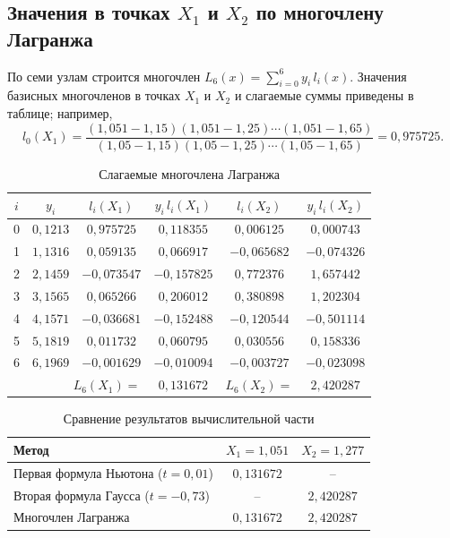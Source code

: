 \documentclass[12pt,a4paper]{article}
\begin{document}
\subsection*{Значения в точках $X_1$ и $X_2$ по многочлену Лагранжа}
По семи узлам строится многочлен $L_6(x)=\sum_{i=0}^{6}y_i\,l_i(x)$. Значения базисных многочленов в точках $X_1$ и $X_2$ и слагаемые суммы приведены в таблице; например,
\[
    l_0(X_1)=\frac{(1{,}051-1{,}15)(1{,}051-1{,}25)\cdots(1{,}051-1{,}65)}{(1{,}05-1{,}15)(1{,}05-1{,}25)\cdots(1{,}05-1{,}65)}=0{,}975725 .
\]

\begin{table}[H]
    \centering
    \caption{Слагаемые многочлена Лагранжа}
    \begin{tabular}{cccccc}
        \toprule
        $i$ & $y_i$ & $l_i(X_1)$ & $y_i\,l_i(X_1)$ & $l_i(X_2)$ & $y_i\,l_i(X_2)$\\
        \midrule
        0 & $0{,}1213$ & $0{,}975725$ & $0{,}118355$ & $0{,}006125$ & $0{,}000743$\\
        1 & $1{,}1316$ & $0{,}059135$ & $0{,}066917$ & $-0{,}065682$ & $-0{,}074326$\\
        2 & $2{,}1459$ & $-0{,}073547$ & $-0{,}157825$ & $0{,}772376$ & $1{,}657442$\\
        3 & $3{,}1565$ & $0{,}065266$ & $0{,}206012$ & $0{,}380898$ & $1{,}202304$\\
        4 & $4{,}1571$ & $-0{,}036681$ & $-0{,}152488$ & $-0{,}120544$ & $-0{,}501114$\\
        5 & $5{,}1819$ & $0{,}011732$ & $0{,}060795$ & $0{,}030556$ & $0{,}158336$\\
        6 & $6{,}1969$ & $-0{,}001629$ & $-0{,}010094$ & $-0{,}003727$ & $-0{,}023098$\\
        \midrule
        \multicolumn{3}{r}{$L_6(X_1)=$} & $0{,}131672$ & $L_6(X_2)=$ & $2{,}420287$\\
        \bottomrule
    \end{tabular}
\end{table}

\begin{table}[H]
    \centering
    \caption{Сравнение результатов вычислительной части}
    \begin{tabular}{lcc}
        \toprule
        Метод & $X_1=1{,}051$ & $X_2=1{,}277$\\
        \midrule
        Первая формула Ньютона ($t=0{,}01$) & $0{,}131672$ & --\\
        Вторая формула Гаусса ($t=-0{,}73$) & -- & $2{,}420287$\\
        Многочлен Лагранжа & $0{,}131672$ & $2{,}420287$\\
        \bottomrule
    \end{tabular}
\end{table}
\end{document}

